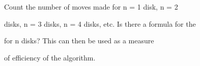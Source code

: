 Count the number of moves made for n = 1 disk, n = 2

disks, n = 3 disks, n = 4 disks, etc. Is there a formula for the

 for n disks? This can then be used as a measure

of efficiency of the algorithm.

